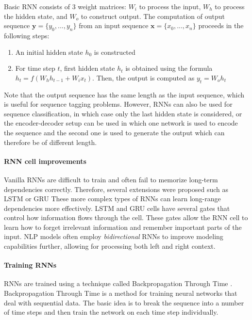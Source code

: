 Basic RNN consists of 3 weight matrices: $W_{i}$ to process the input, $W_h$ to process the hidden state, and $W_o$ to construct output.
The computation of output sequence $\mathbf{y} = \{y_0, ..., y_n\}$ from an input sequence $\mathbf{x} = \{x_0, ..., x_n\}$ proceeds in the following steps:
\begin{enumerate}
    \item An initial hidden state $h_0$ is constructed
    \item For time step $t$, first hidden state $h_t$ is obtained using the formula $h_t = f(W_hh_{t-1} + W_ix_t)$. Then, the output is computed as $y_t = W_oh_t$
\end{enumerate}
Note that the output sequence has the same length as the input sequence, which is useful for sequence tagging problems.
However, RNNs can also be used for sequence classification, in which case only the last hidden state is considered, or the encoder-decoder setup can be used in which one network is used to encode the sequence and the second one is used to generate the output which can therefore be of different length.

\paragraph{RNN cell improvements}
Vanilla RNNs are difficult to train and often fail to memorize long-term dependencies correctly.
Therefore, several extensions were proposed such as LSTM \cite{hochreiter1997} or GRU \cite{cho-etal-2014-properties}
These more complex types of RNNs can learn long-range dependencies more effectively.
LSTM and GRU cells have several gates that control how information flows through the cell.
These gates allow the RNN cell to learn how to forget irrelevant information and remember important parts of the input.
NLP models often employ \emph{bidirectional} RNNs to improve modeling capabilities further, allowing for processing both left and right context.

\paragraph{Training RNNs}
RNNs are trained using a technique called Backpropagation Through Time \cite{werbos1990backpropagation}.
Backpropagation Through Time is a method for training neural networks that deal with sequential data.
The basic idea is to break the sequence into a number of time steps and then train the network on each time step individually.

